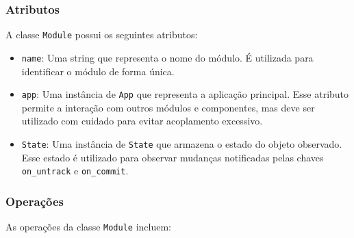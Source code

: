 \subsubsection{Atributos}

A classe \texttt{Module} possui os seguintes atributos:

\begin{itemize}
    \item \texttt{name}: Uma string que representa o nome do módulo. É utilizada para identificar o módulo de forma única.

    \item \texttt{app}: Uma instância de \texttt{App} que representa a aplicação principal. Esse atributo permite a interação com outros módulos e componentes, mas deve ser utilizado com cuidado para evitar acoplamento excessivo.

    \item \texttt{State}: Uma instância de \texttt{State} que armazena o estado do objeto observado. Esse estado é utilizado para observar mudanças notificadas pelas chaves \texttt{on\_untrack} e \texttt{on\_commit}.
\end{itemize}

\subsubsection{Operações}

As operações da classe \texttt{Module} incluem:

